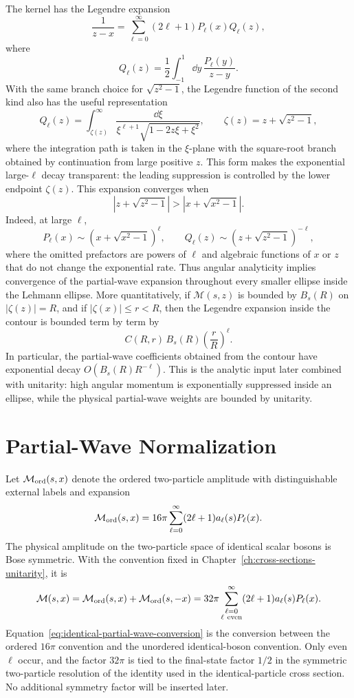 The kernel has the Legendre expansion
\[
  \frac{1}{z-x}
  =
  \sum_{\ell=0}^{\infty}(2\ell+1)P_\ell(x)Q_\ell(z),
\]
where
\[
  Q_\ell(z)
  =
  \frac12\int_{-1}^{1}\dd y\,\frac{P_\ell(y)}{z-y}.
\]
With the same branch choice for \(\sqrt{z^2-1}\), the Legendre function of
the second kind also has the useful representation
\[
  Q_\ell(z)
  =
  \int_{\zeta(z)}^{\infty}
  \frac{\dd \xi}
  {\xi^{\ell+1}\sqrt{1-2z\xi+\xi^2}},
  \qquad
  \zeta(z)=z+\sqrt{z^2-1},
\]
where the integration path is taken in the \(\xi\)-plane with the square-root
branch obtained by continuation from large positive \(z\).  This form makes
the exponential large-\(\ell\) decay transparent: the leading suppression is
controlled by the lower endpoint \(\zeta(z)\).
This expansion converges when
\[
  \left|z+\sqrt{z^2-1}\right|
  >
  \left|x+\sqrt{x^2-1}\right|.
\]
Indeed, at large \(\ell\),
\[
  P_\ell(x)\sim
  \left(x+\sqrt{x^2-1}\right)^\ell,
  \qquad
  Q_\ell(z)\sim
  \left(z+\sqrt{z^2-1}\right)^{-\ell},
\]
where the omitted prefactors are powers of \(\ell\) and algebraic functions
of \(x\) or \(z\) that do not change the exponential rate.  Thus angular analyticity
implies convergence of the partial-wave expansion throughout every smaller
ellipse inside the Lehmann ellipse.  More quantitatively, if
\(\mathcal M(s,z)\) is bounded by \(B_s(R)\) on \(|\zeta(z)|=R\), and if
\(|\zeta(x)|\le r<R\), then the Legendre expansion inside the contour is
bounded term by term by
\[
  C(R,r)\,B_s(R)\left(\frac rR\right)^\ell .
\]
In particular, the partial-wave coefficients obtained from the contour have
exponential decay \(O(B_s(R)R^{-\ell})\).  This is the analytic input later
combined with unitarity: high angular momentum is exponentially suppressed
inside an ellipse, while the physical partial-wave weights are bounded by
unitarity.

\section{Partial-Wave Normalization}
\label{sec:high-energy-partial-wave-normalization}

Let \(\mathcal M_{\rm ord}(s,x)\) denote the ordered two-particle amplitude
with distinguishable external labels and expansion
\[
  \mathcal M_{\rm ord}(s,x)
  =
  16\pi
  \sum_{\ell=0}^{\infty}
  (2\ell+1)a_\ell(s)P_\ell(x).
\]
The physical amplitude on the two-particle space of identical scalar bosons
is Bose symmetric.  With the convention fixed in
Chapter~\ref{ch:cross-sections-unitarity}, it is
\begin{equation}
  \mathcal M(s,x)
  =
  \mathcal M_{\rm ord}(s,x)+\mathcal M_{\rm ord}(s,-x)
  =
  32\pi
  \sum_{\substack{\ell=0\\ \ell\ {\rm even}}}^{\infty}
  (2\ell+1)a_\ell(s)P_\ell(x).
  \label{eq:identical-partial-wave-conversion}
\end{equation}
Equation~\eqref{eq:identical-partial-wave-conversion} is the conversion between
the ordered \(16\pi\) convention and the unordered identical-boson convention.
Only even \(\ell\) occur, and the factor \(32\pi\) is tied to the final-state
factor \(1/2\) in the symmetric two-particle resolution of the identity used in
the identical-particle cross section.  No additional symmetry factor will be
inserted later.

